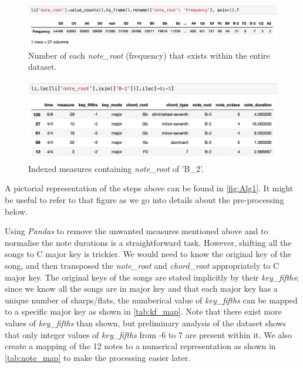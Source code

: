 \begin{figure}
    \centering
    \includegraphics[scale=0.5]{Figures/note frequency}
    \decoRule
    \caption{Number of each \emph{note\_root} (frequency) that exists within the entire dataset.}
    \label{fig:notefreq}
    \end{figure}
    
    \begin{figure}
        \centering
        \includegraphics[scale=0.5]{Figures/irregular notes}
        \decoRule
        \caption{Indexed measures containing \emph{note\_root} of 'B\_2'.}
        \label{fig:irregnote}
        \end{figure}
        
A pictorial representation of the steps above can be found in \cref{fig:Alg1}. It might be useful to refer to that figure as we go into details about the pre-processing below.

Using \emph{Pandas} to remove the unwanted measures mentioned above and to normalise the note durations is a straightforward task. However, shifting all the songs to C major key is trickier. We would need to know the original key of the song, and then transposed the \emph{note\_root} and \emph{chord\_root} appropriately to C major key. The original keys of the songs are stated implicitly by their \emph{key\_fifths}; since we know all the songs are in major key and that each major key has a unique number of sharps/flats, the numberical value of \emph{key\_fifths} can be mapped to a specific major key as shown in \cref{tab:kf_map}. Note that there exist more values of \emph{key\_fifths} than shown, but preliminary analysis of the dataset shows that only integer values of \emph{key\_fifths} from -6 to 7 are present within it. We also create a mapping of the 12 notes to a numerical representation as shown in \cref{tab:note_map} to make the processing easier later.

